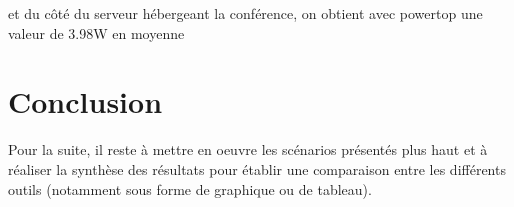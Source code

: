\documentclass[11pt,a4paper]{article}
\begin{document}
et du côté du serveur hébergeant la conférence, on obtient avec powertop une valeur de 3.98W en moyenne

\section{Conclusion}

Pour la suite, il reste à mettre en oeuvre les scénarios présentés plus haut et à réaliser la synthèse des résultats pour établir une comparaison entre les différents outils (notamment sous forme de graphique ou de tableau).
\end{document}
